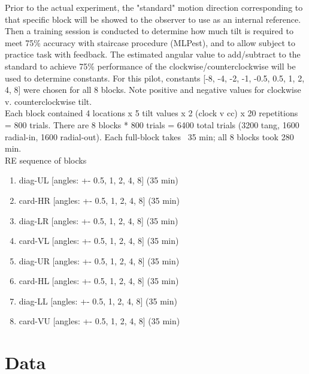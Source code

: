 \documentclass[11pt]{article} %
\begin{document}
Prior to the actual experiment, the "standard" motion direction corresponding to that specific block will be showed to the observer to use as an internal reference. Then a training session is conducted to determine how much tilt is required to meet 75\% accuracy with staircase procedure (MLPest), and to allow subject to practice task with feedback. The estimated angular value to add/subtract to the standard to achieve 75\% performance of the clockwise/counterclockwise will be used to determine constants. For this pilot, constants [-8, -4, -2, -1, -0.5, 0.5, 1, 2, 4, 8] were chosen for all 8 blocks. Note positive and negative values for clockwise v. counterclockwise tilt.
\\
Each block contained 4 locations x 5 tilt values x 2 (clock v cc) x 20 repetitions = 800 trials. There are 8 blocks * 800 trials = 6400 total trials (3200 tang, 1600 radial-in, 1600 radial-out). Each full-block takes ~35 min; all 8 blocks took 280 min. 
\\
RE sequence of blocks 
\begin{enumerate}
\item diag-UL [angles: +- 0.5, 1, 2, 4, 8] (35 min)
\item card-HR [angles: +- 0.5, 1, 2, 4, 8] (35 min)
\item diag-LR [angles: +- 0.5, 1, 2, 4, 8] (35 min)
\item card-VL [angles: +- 0.5, 1, 2, 4, 8] (35 min)
\item diag-UR [angles: +- 0.5, 1, 2, 4, 8] (35 min)
\item card-HL [angles: +- 0.5, 1, 2, 4, 8] (35 min)
\item diag-LL [angles: +- 0.5, 1, 2, 4, 8] (35 min)
\item card-VU [angles: +- 0.5, 1, 2, 4, 8] (35 min)
\end{enumerate}

\newpage
\section{Data}
\end{document}
